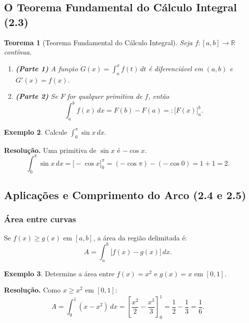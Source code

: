 \documentclass[12pt,a4paper]{article}
\newtheorem{theorem}{Teorema}[section]
\theoremstyle{definition}
\newtheorem{example}[theorem]{Exemplo}
\theoremstyle{remark}
\begin{document}
\subsection{O Teorema Fundamental do Cálculo Integral (2.3)}

\begin{theorem}[Teorema Fundamental do Cálculo Integral]
  Seja $f:[a,b]\to\mathbb{R}$ contínua.
  \begin{enumerate}
    \item \textbf{(Parte 1)} A função $G(x)=\displaystyle\int_a^x f(t)\,dt$
          é diferenciável em $(a,b)$ e $G'(x)=f(x)$.
    \item \textbf{(Parte 2)} Se $F$ for qualquer primitiva de $f$, então
          \[
            \int_a^b f(x)\,dx = F(b)-F(a) =: \Big[F(x)\Big]_a^b.
          \]
  \end{enumerate}
\end{theorem}

\begin{example}
  Calcule $\displaystyle\int_0^{\pi} \sin x\,dx$.

  \textbf{Resolução.} Uma primitiva de $\sin x$ é $-\cos x$.
  \[
    \int_0^{\pi}\sin x\,dx = \Big[-\cos x\Big]_0^{\pi}
      = (-\cos\pi)-(-\cos 0) = 1+1 = 2.
  \]
\end{example}

\subsection{Aplicações e Comprimento do Arco (2.4 e 2.5)}

\subsubsection*{Área entre curvas}

Se $f(x)\geq g(x)$ em $[a,b]$, a área da região delimitada é:
\[
  A = \int_a^b \bigl[f(x)-g(x)\bigr]\,dx.
\]

\begin{example}
  Determine a área entre $f(x)=x^2$ e $g(x)=x$ em $[0,1]$.

  \textbf{Resolução.} Como $x\geq x^2$ em $[0,1]$:
  \[
    A = \int_0^1(x-x^2)\,dx = \left[\frac{x^2}{2}-\frac{x^3}{3}\right]_0^1
      = \frac{1}{2}-\frac{1}{3} = \frac{1}{6}.
  \]
\end{example}
\end{document}
